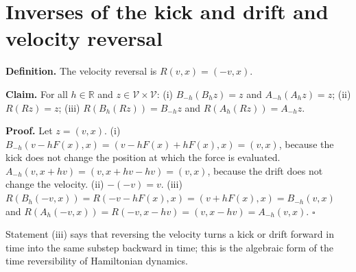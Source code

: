 \documentclass[11pt,a4paper]{article}
\begin{document}
\section{\texorpdfstring{Inverses of the kick and drift and velocity reversal}{Inverses of the kick and drift and velocity reversal}}


\textbf{Definition.} The velocity reversal is \(R(v,x)=(-v,x)\).




\textbf{Claim.} For all \(h\in\mathbb R\) and \(z\in\mathcal V\times\mathcal V\):
(i) \(B_{-h}(B_hz)=z\) and \(A_{-h}(A_hz)=z\);
(ii) \(R(Rz)=z\);
(iii) \(R(B_h(Rz))=B_{-h}z\) and \(R(A_h(Rz))=A_{-h}z\).




\textbf{Proof.} Let \(z=(v,x)\). (i) \(B_{-h}(v-hF(x),x)=(v-hF(x)+hF(x),x)=(v,x)\), because the kick does not change the position at which the force is evaluated. \(A_{-h}(v,x+hv)=(v,x+hv-hv)=(v,x)\), because the drift does not change the velocity. (ii) \(-(-v)=v\). (iii) \(R(B_h(-v,x))=R(-v-hF(x),x)=(v+hF(x),x)=B_{-h}(v,x)\) and \(R(A_h(-v,x))=R(-v,x-hv)=(v,x-hv)=A_{-h}(v,x)\). \(\square\)




Statement (iii) says that reversing the velocity turns a kick or drift forward in time into the same substep backward in time; this is the algebraic form of the time reversibility of Hamiltonian dynamics.
\end{document}
